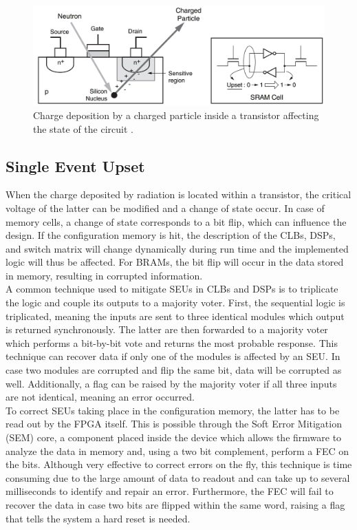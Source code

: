     \begin{figure}[h!]
      \centering
      \includegraphics[width=\textwidth]{img/II-6-irradiation/transistor.png}
      \caption{Charge deposition by a charged particle inside a transistor affecting the state of the circuit \cite{XILINX-RADIATION}.}
      \label{fig:II-6-transistor}
    \end{figure}

    \subsection{Single Event Upset}

      When the charge deposited by radiation is located within a transistor, the critical voltage of the latter can be modified and a change of state occur. In case of memory cells, a change of state corresponds to a bit flip, which can influence the design. If the configuration memory is hit, the description of the CLBs, DSPs, and switch matrix will change dynamically during run time and the implemented logic will thus be affected. For BRAMs, the bit flip will occur in the data stored in memory, resulting in corrupted information. \\

      A common technique used to mitigate SEUs in CLBs and DSPs is to triplicate the logic and couple its outputs to a majority voter. First, the sequential logic is triplicated, meaning the inputs are sent to three identical modules which output is returned synchronously. The latter are then forwarded to a majority voter which performs a bit-by-bit vote and returns the most probable response. This technique can recover data if only one of the modules is affected by an SEU. In case two modules are corrupted and flip the same bit, data will be corrupted as well. Additionally, a flag can be raised by the majority voter if all three inputs are not identical, meaning an error occurred. \\

      To correct SEUs taking place in the configuration memory, the latter has to be read out by the FPGA itself. This is possible through the Soft Error Mitigation (SEM) core, a component placed inside the device which allows the firmware to analyze the data in memory and, using a two bit complement, perform a FEC on the bits. Although very effective to correct errors on the fly, this technique is time consuming due to the large amount of data to readout and can take up to several milliseconds to identify and repair an error. Furthermore, the FEC will fail to recover the data in case two bits are flipped within the same word, raising a flag that tells the system a hard reset is needed. \\

